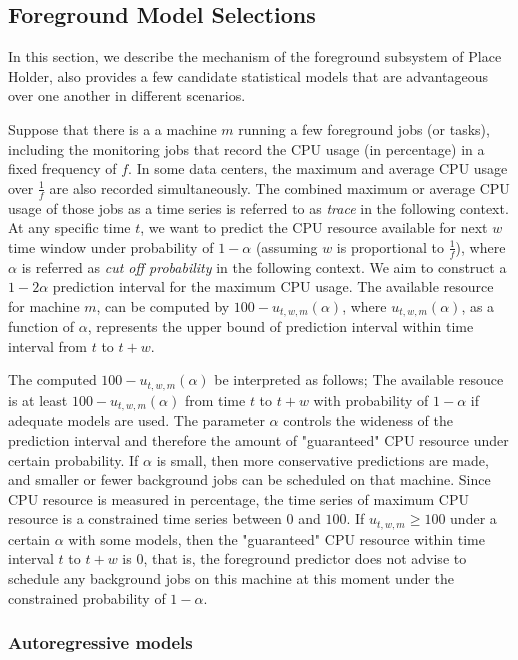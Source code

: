 \documentclass[sigplan,10pt,review,anonymous]{acmart}
\begin{document}
\subsection{Foreground Model Selections}
\label{sec:section3.1}

In this section, we describe the mechanism of the foreground subsystem of Place
Holder, also provides a few candidate statistical models that are advantageous
over one another in different scenarios. 

Suppose that there is a a machine $m$ running a few foreground jobs (or tasks),
including the monitoring jobs that record the CPU usage (in percentage) in a
fixed frequency of $f$. In some data centers, the maximum and average CPU usage
over $\frac{1}{f}$  are also recorded simultaneously. The combined maximum or
average CPU usage of those jobs as a time series is referred to as
\textit{trace} in the following context. At any specific time $t$, we want to
predict the CPU resource available for next $w$ time window under probability of
$1 - \alpha$ (assuming $w$ is proportional to $\frac{1}{f}$), where $\alpha$ is
referred as \textit{cut off probability} in the following context. We aim to
construct a $1 - 2\alpha$ prediction interval for the maximum CPU usage. The
available resource for machine $m$, can be computed by $100 - u_{t, w,
m}(\alpha)$, where $u_{t, w, m}(\alpha)$, as a function of $\alpha$, represents
the upper bound of prediction interval within time interval from $t$ to $t + w$.

The computed $100 - u_{t, w, m}(\alpha)$ be interpreted as follows; The
available resouce is at least $100 - u_{t, w, m}(\alpha)$ from time $t$ to $t +
w$ with probability of $1 - \alpha$ if adequate models are used. The parameter
$\alpha$ controls the wideness of the prediction interval and therefore the
amount of "guaranteed" CPU resource under certain probability. If $\alpha$ is
small, then more conservative predictions are made, and smaller or fewer
background jobs can be scheduled on that machine. Since CPU resource is measured
in percentage, the time series of maximum CPU resource is a constrained time
series between $0$ and $100$. If $u_{t, w, m} \geq 100$ under a certain $\alpha$
with some models, then the "guaranteed" CPU resource within time interval $t$ to
$t + w$ is $0$, that is, the foreground predictor does not advise to schedule any
background jobs on this machine at this moment under the constrained probability
of $1 - \alpha$.

\subsubsection{Autoregressive models}
\end{document}
